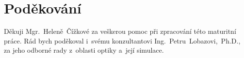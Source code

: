 \vspace*{\fill}

\chapter*{Poděkování}

\begin{sloppypar}
Děkuji \mbox{Mgr. Heleně Čížkové} za veškerou pomoc při zpracování této maturitní práce. Rád bych poděkoval i~svému konzultantovi \mbox{Ing. Petru Lobazovi, Ph.D.,} za jeho odborné rady z~oblasti optiky a~její simulace.
\end{sloppypar}

\vspace*{1cm}
